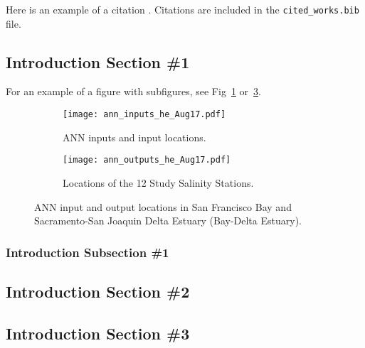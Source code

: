 
Here is an example of a citation \cite{ref:oetiker1995not}. Citations are included in the \texttt{cited\_works.bib} file.

\blindtext

\subsection{Introduction Section \#1}
\label{sect:intro_1}

For an example of a figure with subfigures, see Fig~\ref{fig:ann_inputs} or~\ref{fig:ann_outputs}.

\blindtext 

\begin{figure}[htbp]
	\begin{subfigure}[t]{.45\textwidth}
		\texttt{[image: ann\_inputs\_he\_Aug17.pdf]}
		\caption{ANN inputs and input locations.}
		\label{fig:ann_inputs}
	\end{subfigure}
	\begin{subfigure}[t]{.45\textwidth}
		\centering
		\texttt{[image: ann\_outputs\_he\_Aug17.pdf]}
		\caption{Locations of the 12 Study Salinity Stations.}
		\label{fig:ann_outputs}
	\end{subfigure}
\caption{ANN input and output locations in San Francisco Bay and Sacramento-San Joaquin Delta Estuary (Bay-Delta Estuary).}
\end{figure}

\subsubsection{Introduction Subsection \#1}
\label{sect:intro_1}
\blindtext
\blindtext

\subsection{Introduction Section \#2}
\label{sect:intro_2}

\blindtext 

\subsection{Introduction Section \#3}
\label{sect:intro_3}
\blindtext
